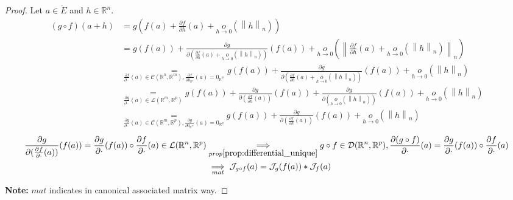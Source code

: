 \documentclass[11pt,en]{elegantpaper}
\newcommand{\norm}[1]{\left\lVert#1\right\rVert}
\newcommand{\Real}{\mathbb{R}}
\begin{document}
\begin{proof}
  Let $a \in \mathring{E}$ and $h \in \Real^n$.
  \begin{equation*}
    \begin{split}
      (g \circ f)(a+h) & = g(f(a) + \frac{\partial f}{\partial h}(a) + \underset{h \to 0}o(\norm h _n)) \\
      & = g(f(a)) + \frac{\partial g}{\partial (\frac{\partial f}{\partial h}(a) + \underset{h \to 0}o(\norm h _n))}(f(a))
        + \underset{h \to 0}o(\norm{\frac{\partial f}{\partial h}(a) + \underset{h \to 0}o(\norm h _n)}_n) \\
      & \underset{\frac{\partial f}{\partial \cdot}(a) \in \mathcal{C}(\Real^n,\Real^m),\frac{\partial f}{\partial 0_{\Real^n}}(a) = 0_{\Real^m}}
        = g(f(a)) + \frac{\partial g}{\partial (\frac{\partial f}{\partial h}(a) + \underset{h \to 0}o(\norm h _n))}(f(a)) + \underset{h \to 0}o(\norm h _n) \\
      & \underset{\frac{\partial g}{\partial \cdot}(a) \in \mathcal{L}(\Real^m,\Real^p)}
        = g(f(a)) + \frac{\partial g}{\partial (\frac{\partial f}{\partial h}(a))}(f(a)) + \frac{\partial g}{\partial (\underset{h \to 0}o(\norm h _n))}(f(a)) + \underset{h \to 0}o(\norm h _n) \\
      & \underset{\frac{\partial g}{\partial \cdot}(a) \in \mathcal{C}(\Real^m,\Real^p),\frac{\partial g}{\partial 0_{\Real^m}}(a) = 0_{\Real^p}}
        = g(f(a)) + \frac{\partial g}{\partial (\frac{\partial f}{\partial h}(a))}(f(a)) + \underset{h \to 0}o(\norm h _n)
    \end{split}
  \end{equation*}
  \begin{equation*}
    \begin{split}
      \frac{\partial g}{\partial (\frac{\partial f}{\partial \cdot}(a))}(f(a)) = \frac{\partial g}{\partial \cdot}(f(a)) \circ \frac{\partial f}{\partial \cdot}(a) \in \mathcal{L}(\Real^n, \Real^p)
      & \underset{prop\ref{prop:differential_unique}}\implies g \circ f \in \mathcal{D}(\Real^n, \Real^p), \frac{\partial (g \circ f)}{\partial \cdot}(a) = \frac{\partial g}{\partial \cdot}(f(a)) \circ \frac{\partial f}{\partial \cdot}(a) \\
      & \underset{mat}\implies \mathcal{J}_{g \circ f}(a) = \mathcal{J}_{g}(f(a)) * \mathcal{J}_{f}(a)
    \end{split}
  \end{equation*} \par

  \textbf{Note:} $mat$ indicates in canonical associated matrix way. \par
\end{proof}
\end{document}
